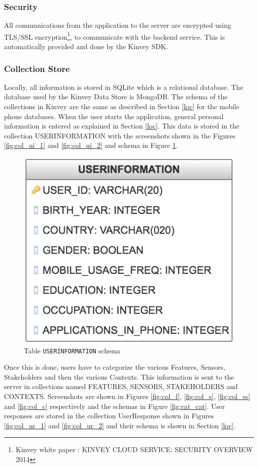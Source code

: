 \subsubsection{Security}

All communications from the application to the server are encrypted using TLS/SSL encryption\footnote{Kinvey white paper : KINVEY CLOUD
SERVICE: SECURITY
OVERVIEW 2014}, to communicate with the backend service. This is automatically provided and done by the Kinvey SDK.

\subsubsection{Collection Store}

Locally, all information is stored in SQLite which is a relational database. The database used by the Kinvey Data Store is MongoDB. The schema of the collections in Kinvey are the same as described in Section \ref{loc} for the mobile phone databases.
When the user starts the application, general personal information is entered as explained in Section \ref{loc}. This data is stored in the
collection USERINFORMATION with the screenshots shown in the Figures \ref{fig:col_ui_1} and \ref{fig:col_ui_2} and schema in Figure \ref{fig:cat_cat_cat}.

\begin{figure}[ht!]
\centering
\includegraphics[width=0.4\linewidth]{./images/schema_ui}
\caption{Table \texttt{USERINFORMATION} schema}
\label{fig:cat_cat_cat}
\end{figure}

Once this is done, users have to categorize the various Features, Sensors, Stakeholders and then the various Contexts. This information is sent to the server in collections named FEATURES, SENSORS, STAKEHOLDERS and CONTEXTS. Screenshots are shown in Figures \ref{fig:col_f}, \ref{fig:col_s}, \ref{fig:col_ss} and \ref{fig:col_c} respectively and the schemas in Figure \ref{fig:cat_cat}. User responses are stored in the collection UserResponse shown in Figures \ref{fig:col_ur_1} and \ref{fig:col_ur_2} and their schema is shown in Section \ref{loc}.


